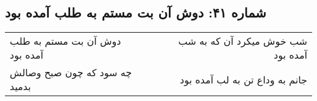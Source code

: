 \begin{center}
\section*{شماره ۴۱: دوش آن بت مستم به طلب آمده بود}
\label{sec:041}
\begin{longtable}{l p{0.5cm} r}
دوش آن بت مستم به طلب آمده بود
&&
شب خوش میکرد آن که به شب آمده بود
\\
چه سود که چون صبح وصالش بدمید
&&
جانم به وداع تن به لب آمده بود
\\
\end{longtable}
\end{center}
